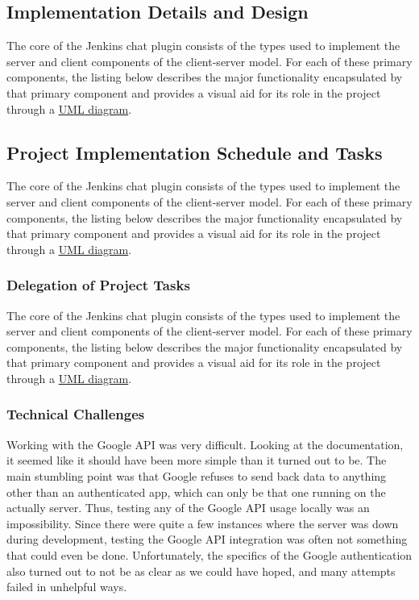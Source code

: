 \documentclass{article}
\begin{document}
		\subsection[Server Implementation]{Implementation Details and Design}
		The core of the Jenkins chat plugin consists of the types used to
		implement the server and client components of the client-server model.
		For each of these primary components, the listing below describes the
		major functionality encapsulated by that primary component and provides
		a visual aid for its role in the project through a 
		\href{http://www.csci.csusb.edu/dick/samples/uml0.html}{UML diagram}.

		\subsection[Implementation Schedule]{Project Implementation Schedule and Tasks}
		The core of the Jenkins chat plugin consists of the types used to
		implement the server and client components of the client-server model.
		For each of these primary components, the listing below describes the
		major functionality encapsulated by that primary component and provides
		a visual aid for its role in the project through a 
		\href{http://www.csci.csusb.edu/dick/samples/uml0.html}{UML diagram}.

			\subsubsection[Task Delegation]{Delegation of Project Tasks}
			The core of the Jenkins chat plugin consists of the types used to
			implement the server and client components of the client-server model.
			For each of these primary components, the listing below describes the
			major functionality encapsulated by that primary component and provides
			a visual aid for its role in the project through a 
			\href{http://www.csci.csusb.edu/dick/samples/uml0.html}{UML diagram}.

			\subsubsection[Challenges]{Technical Challenges}
			Working with the Google API was very difficult.
			Looking at the documentation, it seemed like it should have been more simple
			than it turned out to be. The main stumbling point was that Google refuses to
			send back data to anything other than an authenticated app, which can only be
			that one running on the actually server. Thus, testing any of the Google API
			usage locally was an impossibility. Since there were quite a few instances
			where the server was down during development, testing the Google API integration
			was often not something that could even be done. Unfortunately, the specifics
			of the Google authentication also turned out to not be as clear as we could
			have hoped, and many attempts failed in unhelpful ways.
\end{document}
